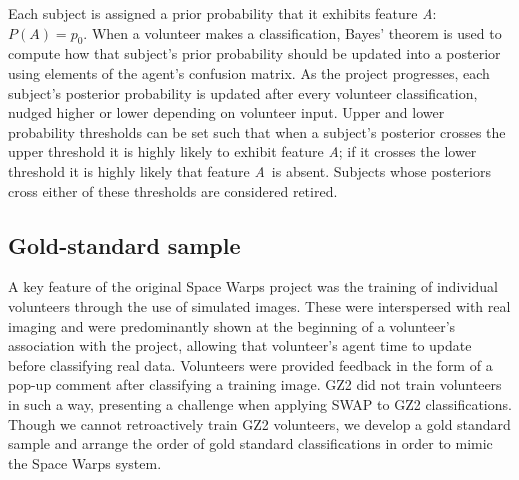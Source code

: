 \documentclass[twocolumn,  trackchanges,]{aastex6}%
\newcommand{\A}{\textit{A}}
\begin{document}
Each subject is assigned a prior probability that it exhibits feature \A: $P(A) = p_0$. 
When a volunteer makes a classification, Bayes' theorem is used to compute how 
that subject's prior probability should be updated into a posterior using elements
of the agent's confusion matrix. 
As the project progresses, each subject's posterior probability is updated after every volunteer classification, 
 nudged higher or lower depending on volunteer input. 
Upper and lower probability thresholds can be set such that when a subject's posterior crosses the upper threshold it is highly likely to exhibit feature \A; if it crosses the lower threshold it is highly likely that feature \A~is absent. Subjects whose posteriors cross either of these thresholds are considered retired.


\subsection{Gold-standard sample}\label{sec: training sample}

A key feature of the original Space Warps project was the training of 
individual volunteers through the use of simulated images.
These were interspersed with real imaging and were 
predominantly shown at the beginning of a volunteer's association with the project, 
allowing that volunteer's agent time to update before classifying real data. 
Volunteers were provided feedback in the form of a pop-up comment after
classifying a training image. GZ2 did not train volunteers in such a way, presenting
 a challenge when applying SWAP to GZ2 classifications. 
Though we cannot retroactively train GZ2 volunteers, we develop a gold standard sample and arrange the order of gold standard classifications in order to mimic the Space Warps system.
\end{document}
